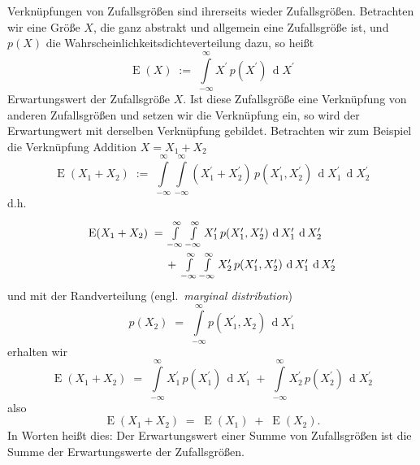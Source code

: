Verknüpfungen von Zufallsgrößen sind ihrerseits wieder Zufallsgrößen. Betrachten
wir eine Größe $X$, die ganz abstrakt und allgemein eine Zufallsgröße ist, und
$p(X)$ die Wahrscheinlichkeitsdichteverteilung dazu, so heißt
\begin{equation}
\operatorname{E}(X) \; := \;  \int\limits_{-\infty}^{\infty}
X^\prime \, p(X^\prime) \, \operatorname{d} X^\prime
\end{equation}
Erwartungswert der Zufallsgröße $X$.
Ist diese Zufallsgröße eine Verknüpfung von anderen Zufallsgrößen und setzen wir die
Verknüpfung ein, so wird der Erwartungwert mit derselben Verknüpfung gebildet.
Betrachten wir zum Beispiel die Verknüpfung Addition $X = X_1 + X_2$
\begin{equation}
\operatorname{E}(X_1 + X_2) \; := \;  \int\limits_{-\infty}^{\infty} \int\limits_{-\infty}^{\infty}
(X_1^\prime + X_2^\prime) \, p(X_1^\prime, X_2^\prime) \, \operatorname{d} X_1^\prime \, \operatorname{d} X_2^\prime
\end{equation}
d.h.
\begin{equation}
\arraycolsep=2.0pt\def\arraystretch{2.0}
\begin{array}{ll}
\operatorname{E}(X_1 + X_2) \; = & \int\limits_{-\infty}^{\infty} \int\limits_{-\infty}^{\infty}
X_1^\prime \, p(X_1^\prime, X_2^\prime) \, 
\operatorname{d} X_1^\prime \, \operatorname{d} X_2^\prime\\
& + \; \int\limits_{-\infty}^{\infty} \int\limits_{-\infty}^{\infty} 
X_2^\prime \, p(X_1^\prime, X_2^\prime) \, \operatorname{d} X_1^\prime \, \operatorname{d} X_2^\prime
\end{array}
\end{equation}
und mit der Randverteilung (engl.\ \textsl{marginal distribution}) 
\begin{equation}
p(X_2) \; = \;
\int\limits_{-\infty}^{\infty} p(X_1^\prime, X_2) \, \operatorname{d} X_1^\prime
\label{marginalDistr}
\end{equation}
erhalten wir
\begin{equation}
\operatorname{E}(X_1 + X_2) \; = \; \int\limits_{-\infty}^{\infty}
X_1^\prime \, p(X_1^\prime) \, \operatorname{d} X_1^\prime 
\; + \; \int\limits_{-\infty}^{\infty} 
X_2^\prime \, p(X_2^\prime) \, \operatorname{d} X_2^\prime
\end{equation}
also
\begin{equation}
\operatorname{E}(X_1 + X_2) \; = \; \operatorname{E}(X_1) \; + \; \operatorname{E}(X_2).
\label{EwSummeISTSummeEw}
\end{equation}
In Worten heißt dies: Der Erwartungswert einer Summe von Zufallsgrößen ist die
Summe der Erwartungswerte der Zufallsgrößen.

